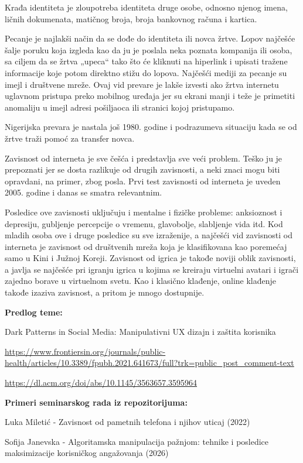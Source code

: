 \documentclass{article}
\begin{document}
Krađa identiteta je zloupotreba identiteta druge osobe, odnosno njenog imena, ličnih dokumenata, matičnog broja, broja bankovnog računa i kartica. 

Pecanje je najlakši način da se dođe do identiteta ili novca žrtve. Lopov najčešće šalje poruku koja izgleda kao da ju je poslala neka poznata kompanija ili osoba, sa ciljem da se žrtva „upeca“ tako što će kliknuti na hiperlink i upisati tražene informacije koje potom direktno stižu do lopova. Najčešći mediji za pecanje su imejl i društvene mreže. Ovaj vid prevare je lakše izvesti ako žrtva internetu uglavnom pristupa preko mobilnog uređaja jer su ekrani manji i teže je primetiti anomaliju u imejl adresi pošiljaoca ili stranici kojoj pristupamo. 

Nigerijska prevara je nastala još 1980. godine i podrazumeva situaciju kada se od žrtve traži pomoć za transfer novca.

Zavisnost od interneta je sve češća i predstavlja sve veći problem. Teško ju je prepoznati jer se dosta razlikuje od drugih zavisnosti, a neki znaci mogu biti opravdani, na primer, zbog posla. Prvi test zavisnosti od interneta je uveden 2005. godine i danas se smatra relevantnim. 

Posledice ove zavisnosti uključuju i mentalne i fizičke probleme: anksioznost i depresiju, gubljenje percepcije o vremenu, glavobolje, slabljenje vida itd. Kod mladih osoba ove i druge posledice su sve izraženije, a najčešći vid zavisnosti od interneta je zavisnost od društvenih mreža koja je klasifikovana kao poremećaj samo u Kini i Južnoj Koreji. Zavisnost od igrica je takođe noviji oblik zavisnosti, a javlja se najčešće pri igranju igrica u kojima se kreiraju virtuelni avatari i igrači zajedno borave u virtuelnom svetu. Kao i klasično klađenje, online klađenje takođe izaziva zavisnost, a pritom je mnogo dostupnije.

\textbf{Predlog teme:}

Dark Patterns in Social Media: Manipulativni UX dizajn i zaštita korisnika

\url{https://www.frontiersin.org/journals/public-health/articles/10.3389/fpubh.2021.641673/full?trk=public_post_comment-text}

\url{https://dl.acm.org/doi/abs/10.1145/3563657.3595964}

\textbf{Primeri seminarskog rada iz repozitorijuma:}

Luka Miletić - Zavisnost od pametnih telefona i njihov uticaj (2022)

Sofija Janevska - Algoritamska manipulacija pažnjom: tehnike i posledice maksimizacije korisničkog angažovanja (2026)
\end{document}
